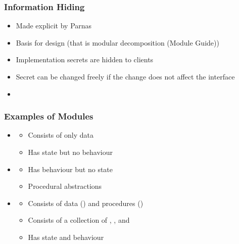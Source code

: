 \documentclass[t,12pt,numbers,fleqn]{beamer}
\begin{document}
\begin{frame}
\frametitle{Information Hiding}

\begin{itemize}

\item Made explicit by Parnas \cite{Parnas1972a}
\item Basis for design (that is modular decomposition (Module Guide))
\item Implementation secrets are hidden to clients
\item Secret can be changed freely if the change does not affect the interface
\item {}

\end{itemize}

\end{frame}


\begin{frame}
\frametitle{Examples of Modules \cite{GhezziEtAl2003}}

\begin{itemize}

\item {}
\begin{itemize}
\item Consists of only data
\item Has state but no behaviour
\end{itemize}
\item {}
\begin{itemize}
\item Has behaviour but no state
\item Procedural abstractions
\end{itemize}
\item {}
\begin{itemize}
\item Consists of data () and procedures ()
\item Consists of a collection of ,
  , and 
\item Has state and behaviour
\end{itemize}
\end{itemize}

\end{frame}
\end{document}
